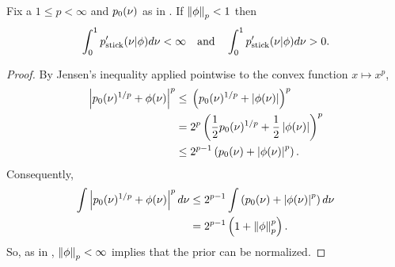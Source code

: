 \begin{lem}
%
Fix a $1 \le p < \infty$ and $p_{0}(\nu)$ as in .
If $\left\Vert\phi\right\Vert_p < 1$ then
%
\begin{align*}
%
\int_0^1 \pstick'(\nu \vert \phi) d\nu < \infty
\mathtxt{and}
\int_0^1 \pstick'(\nu \vert \phi) d\nu > 0.
%
\end{align*}
%
\begin{proof}
%
By Jensen's inequality applied pointwise to the convex function $x \mapsto
x^p$,
%
\begin{align*}
%
\abs{\pbase(\nu)^{1/p} + \phi(\nu) }^{p} \le{}&
    \left(\pbase(\nu)^{1/p} + \abs{\phi(\nu)} \right)^{p}
\\={}&
    2^p \left(\frac{1}{2}\pbase(\nu)^{1/p} +
              \frac{1}{2} \abs{\phi(\nu)} \right)^{p}
\\\le{}&
    2^{p-1} \left(\pbase(\nu) + \abs{\phi(\nu)}^p \right).
%
\end{align*}
%
Consequently,
%
\begin{align*}
%
\int \abs{\pbase(\nu)^{1/p} + \phi(\nu) }^{p} d\nu \le{}&
    2^{p-1} \int \left(\pbase(\nu) + \abs{\phi(\nu)}^p \right) d\nu
\\={}&
    2^{p-1} \left(1 + \norm{\phi}_p^p\right).
%
\end{align*}
%
So, as in \citep[Result 2]{gustafson:1996:local}, $\left\Vert\phi\right\Vert_p < \infty$
implies that the prior can be normalized.


\end{proof}
\end{lem}
